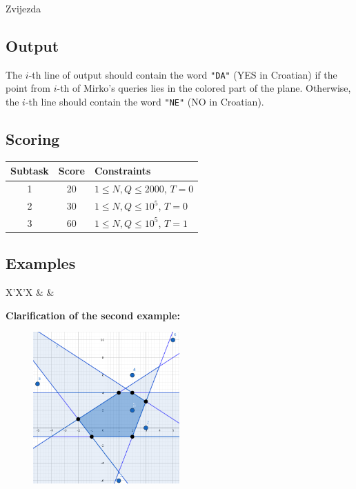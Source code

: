 \begin{statement}[
  problempoints=110,
  timelimit=1 second,
  memorylimit=512 MiB,
]{Zvijezda}
\subsection*{Output}
The $i$-th line of output should contain the word \texttt{"DA"} (YES in
Croatian) if the point from $i$-th of Mirko's queries lies in the colored
part of the plane. Otherwise, the $i$-th line should contain the word
\texttt{"NE"} (NO in Croatian).

\subsection*{Scoring}
{\renewcommand{\arraystretch}{1.4}
  \setlength{\tabcolsep}{6pt}
  \begin{tabular}{ccl}
 Subtask & Score & Constraints \\ \midrule
  1 & 20 & $1 \le N, Q \le 2000$, $T = 0$ \\
  2 & 30 & $1 \le N, Q \le 10^5$, $T = 0$ \\
  3 & 60 & $1 \le N, Q \le 10^5$, $T = 1$
\end{tabular}}

\subsection*{Examples}
\begin{tabularx}{\textwidth}{X'X'X}
 &
 &
\end{tabularx}

\textbf{Clarification of the second example:}
\begin{figure}[H]
\centering
\includegraphics[width=0.5\textwidth]{img/zvijezda_clar.png}
\end{figure}


\end{statement}
